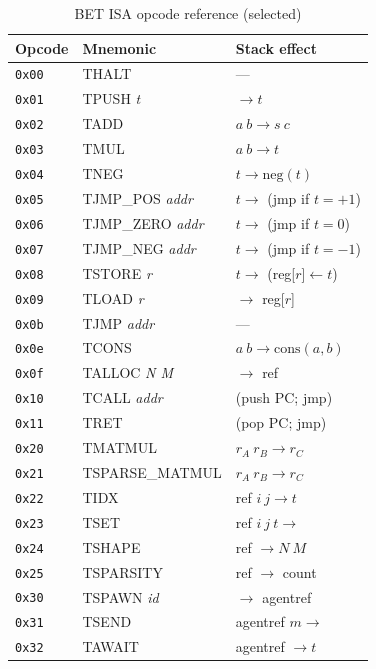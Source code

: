 \documentclass[journal,10pt,twocolumn]{IEEEtran}
\begin{document}
\begin{table}[h]
\centering
\small
\caption{BET ISA opcode reference (selected)}
\label{tab:isa}
\begin{tabular}{lll}
\toprule
Opcode & Mnemonic & Stack effect \\
\midrule
\texttt{0x00} & THALT            & --- \\
\texttt{0x01} & TPUSH \textit{t} & $\to t$ \\
\texttt{0x02} & TADD             & $a\ b \to s\ c$ \\
\texttt{0x03} & TMUL             & $a\ b \to t$ \\
\texttt{0x04} & TNEG             & $t \to \mathrm{neg}(t)$ \\
\texttt{0x05} & TJMP\_POS \textit{addr} & $t \to$ (jmp if $t=+1$) \\
\texttt{0x06} & TJMP\_ZERO \textit{addr}& $t \to$ (jmp if $t=0$) \\
\texttt{0x07} & TJMP\_NEG \textit{addr} & $t \to$ (jmp if $t=-1$) \\
\texttt{0x08} & TSTORE \textit{r}& $t \to$ (reg[$r$]$\leftarrow t$) \\
\texttt{0x09} & TLOAD \textit{r} & $\to$ reg[$r$] \\
\texttt{0x0b} & TJMP \textit{addr}& --- \\
\texttt{0x0e} & TCONS            & $a\ b \to \mathrm{cons}(a,b)$ \\
\texttt{0x0f} & TALLOC \textit{N M} & $\to$ ref \\
\texttt{0x10} & TCALL \textit{addr} & (push PC; jmp) \\
\texttt{0x11} & TRET            & (pop PC; jmp) \\
\texttt{0x20} & TMATMUL         & $r_A\ r_B \to r_C$ \\
\texttt{0x21} & TSPARSE\_MATMUL & $r_A\ r_B \to r_C$ \\
\texttt{0x22} & TIDX            & ref $i\ j \to t$ \\
\texttt{0x23} & TSET            & ref $i\ j\ t \to$ \\
\texttt{0x24} & TSHAPE          & ref $\to N\ M$ \\
\texttt{0x25} & TSPARSITY       & ref $\to$ count \\
\texttt{0x30} & TSPAWN \textit{id} & $\to$ agentref \\
\texttt{0x31} & TSEND           & agentref $m \to$ \\
\texttt{0x32} & TAWAIT          & agentref $\to t$ \\
\bottomrule
\end{tabular}
\end{table}
\end{document}
